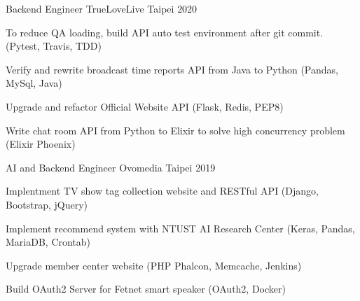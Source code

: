 

\begin{cventries}

  \cventry
    {Backend Engineer} %
    {TrueLoveLive} %
    {Taipei} %
    {2020} %
    {
      \begin{cvitems} %
        \item {To reduce QA loading, build API auto test environment after git commit. (Pytest, Travis, TDD)}
        \item {Verify and rewrite broadcast time reports API from Java to Python (Pandas, MySql, Java)}
        \item {Upgrade and refactor Official Website API (Flask, Redis, PEP8)}
        \item {Write chat room API from Python to Elixir to solve high concurrency problem (Elixir Phoenix)}
      \end{cvitems}
    }

  \cventry
    {AI and Backend Engineer} %
    {Ovomedia} %
    {Taipei} %
    {2019} %
    {
      \begin{cvitems} %
        \item {Implentment TV show tag collection website and RESTful API (Django, Bootstrap, jQuery)}
        \item {Implement recommend system with NTUST AI Research Center (Keras, Pandas, MariaDB, Crontab)}
        \item {Upgrade member center website (PHP Phalcon, Memcache, Jenkins)}
        \item {Build OAuth2 Server for Fetnet smart speaker (OAuth2, Docker)}
      \end{cvitems}
    }

\end{cventries}
